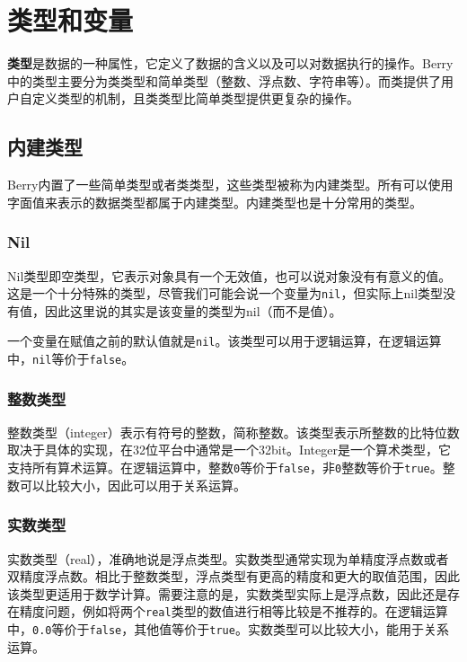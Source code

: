 \chapter{类型和变量}

\textbf{类型}是数据的一种属性，它定义了数据的含义以及可以对数据执行的操作。Berry中的类型主要分为类类型和简单类型（整数、浮点数、字符串等）。而类提供了用户自定义类型的机制，且类类型比简单类型提供更复杂的操作。

\section{内建类型}

Berry内置了一些简单类型或者类类型，这些类型被称为内建类型。所有可以使用字面值来表示的数据类型都属于内建类型。内建类型也是十分常用的类型。

\subsection{Nil}

Nil类型即空类型，它表示对象具有一个无效值，也可以说对象没有有意义的值。这是一个十分特殊的类型，尽管我们可能会说一个变量为\texttt{nil}，但实际上nil类型没有值，因此这里说的其实是该变量的类型为nil（而不是值）。

一个变量在赋值之前的默认值就是\texttt{nil}。该类型可以用于逻辑运算，在逻辑运算中，\texttt{nil}等价于\texttt{false}。

\subsection{整数类型}

整数类型（integer）表示有符号的整数，简称整数。该类型表示所整数的比特位数取决于具体的实现，在32位平台中通常是一个32bit。Integer是一个算术类型，它支持所有算术运算。在逻辑运算中，整数\texttt{0}等价于\texttt{false}，非\texttt{0}整数等价于\texttt{true}。整数可以比较大小，因此可以用于关系运算。

\subsection{实数类型}

实数类型（real），准确地说是浮点类型。实数类型通常实现为单精度浮点数或者双精度浮点数。相比于整数类型，浮点类型有更高的精度和更大的取值范围，因此该类型更适用于数学计算。需要注意的是，实数类型实际上是浮点数，因此还是存在精度问题，例如将两个\texttt{real}类型的数值进行相等比较是不推荐的。在逻辑运算中，\texttt{0.0}等价于\texttt{false}，其他值等价于\texttt{true}。实数类型可以比较大小，能用于关系运算。

